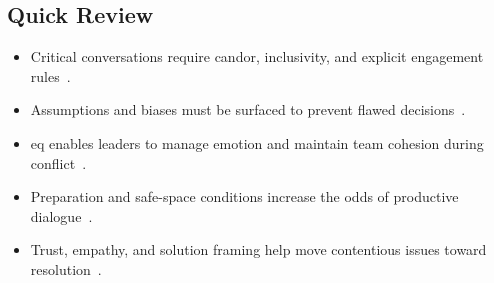 \documentclass[../main.tex]{subfiles}
\begin{document}
\subsection{Quick Review}
\begin{itemize}
  \item Critical conversations require candor, inclusivity, and explicit engagement rules~\autocite{edo-5-2-9-critical-conversations-2025}.
  \item Assumptions and biases must be surfaced to prevent flawed decisions~\autocite{edo-5-2-9-critical-conversations-2025}.
  \item \ac{eq} enables leaders to manage emotion and maintain team cohesion during conflict~\autocite{edo-5-2-9-critical-conversations-2025}.
  \item Preparation and safe-space conditions increase the odds of productive dialogue~\autocite{edo-5-2-9-critical-conversations-2025}.
  \item Trust, empathy, and solution framing help move contentious issues toward resolution~\autocite{edo-5-2-9-critical-conversations-2025}.
\end{itemize}

\end{document}
